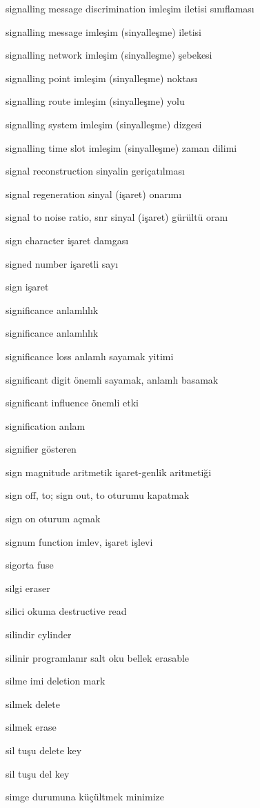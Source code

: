 \documentclass[12pt,fleqn]{article}\usepackage{../../common}
\begin{document}
signalling message discrimination imleşim iletisi sınıflaması

signalling message imleşim (sinyalleşme) iletisi

signalling network imleşim (sinyalleşme) şebekesi

signalling point imleşim (sinyalleşme) noktası

signalling route imleşim (sinyalleşme) yolu

signalling system imleşim (sinyalleşme) dizgesi

signalling time slot imleşim (sinyalleşme) zaman dilimi

signal reconstruction sinyalin geriçatılması

signal regeneration sinyal (işaret) onarımı

signal to noise ratio, snr sinyal (işaret) gürültü oranı

sign character işaret damgası

signed number işaretli sayı

sign işaret

significance anlamlılık

significance anlamlılık

significance loss anlamlı sayamak yitimi

significant digit önemli sayamak, anlamlı basamak

significant influence önemli etki

signification anlam

signifier gösteren

sign magnitude aritmetik işaret-genlik aritmetiği

sign off, to; sign out, to oturumu kapatmak

sign on oturum açmak

signum function imlev, işaret işlevi

sigorta fuse

silgi eraser

silici okuma destructive read

silindir cylinder

silinir programlanır salt oku bellek erasable

silme imi deletion mark

silmek delete

silmek erase

sil tuşu delete key

sil tuşu del key

simge durumuna küçültmek minimize
\end{document}
